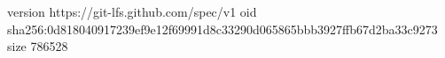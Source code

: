 version https://git-lfs.github.com/spec/v1
oid sha256:0d818040917239ef9e12f69991d8c33290d065865bbb3927ffb67d2ba33c9273
size 786528
